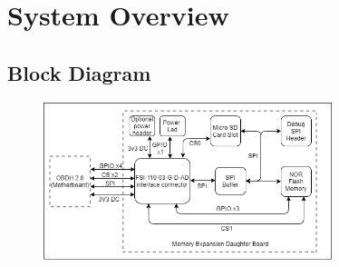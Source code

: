 %
%
%
%
%

%
%
%
%
%
%
%

\chapter{System Overview} \label{ch:system_overview}

\section{Block Diagram}

\begin{figure}[!ht]
    \begin{center}
        \includegraphics[width=0.75\textwidth]{figures/Architecture_Memory_Expansion_DB.png}
        \label{fig:block-diagram}
    \end{center}
\end{figure}